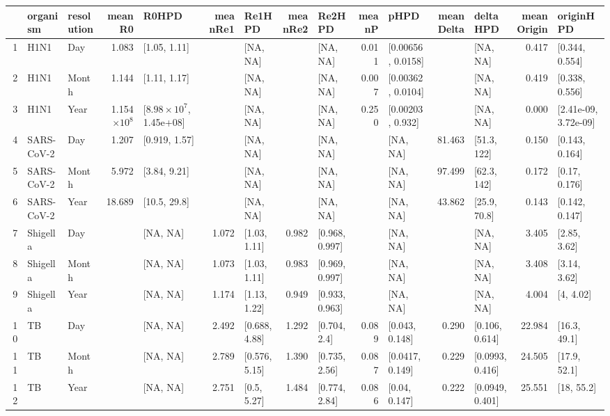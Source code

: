 \documentclass{article}
\begin{document}
\begin{spacing}{1.5}
\begin{table}[ht]
\centering
\begin{tabular}{rllrlrlrlrlrlrl}
  \hline
 & organism & resolution & meanR0 & R0HPD & meanRe1 & Re1HPD & meanRe2 & Re2HPD & meanP & pHPD & meanDelta & deltaHPD & meanOrigin & originHPD \\ 
  \hline
1 & H1N1 & Day & 1.083 & [1.05, 1.11] &  & [NA, NA] &  & [NA, NA] & 0.011 & [0.00656, 0.0158] &  & [NA, NA] & 0.417 & [0.344, 0.554] \\ 
  2 & H1N1 & Month & 1.144 & [1.11, 1.17] &  & [NA, NA] &  & [NA, NA] & 0.007 & [0.00362, 0.0104] &  & [NA, NA] & 0.419 & [0.338, 0.556] \\ 
  3 & H1N1 & Year & 1.154$\times 10^8$ & [$8.98\times10^7$, 1.45e+08] &  & [NA, NA] &  & [NA, NA] & 0.250 & [0.00203, 0.932] &  & [NA, NA] & 0.000 & [2.41e-09, 3.72e-09] \\ 
  4 & SARS-CoV-2 & Day & 1.207 & [0.919, 1.57] &  & [NA, NA] &  & [NA, NA] &  & [NA, NA] & 81.463 & [51.3, 122] & 0.150 & [0.143, 0.164] \\ 
  5 & SARS-CoV-2 & Month & 5.972 & [3.84, 9.21] &  & [NA, NA] &  & [NA, NA] &  & [NA, NA] & 97.499 & [62.3, 142] & 0.172 & [0.17, 0.176] \\ 
  6 & SARS-CoV-2 & Year & 18.689 & [10.5, 29.8] &  & [NA, NA] &  & [NA, NA] &  & [NA, NA] & 43.862 & [25.9, 70.8] & 0.143 & [0.142, 0.147] \\ 
  7 & Shigella & Day &  & [NA, NA] & 1.072 & [1.03, 1.11] & 0.982 & [0.968, 0.997] &  & [NA, NA] &  & [NA, NA] & 3.405 & [2.85, 3.62] \\ 
  8 & Shigella & Month &  & [NA, NA] & 1.073 & [1.03, 1.11] & 0.983 & [0.969, 0.997] &  & [NA, NA] &  & [NA, NA] & 3.408 & [3.14, 3.62] \\ 
  9 & Shigella & Year &  & [NA, NA] & 1.174 & [1.13, 1.22] & 0.949 & [0.933, 0.963] &  & [NA, NA] &  & [NA, NA] & 4.004 & [4, 4.02] \\ 
  10 & TB & Day &  & [NA, NA] & 2.492 & [0.688, 4.88] & 1.292 & [0.704, 2.4] & 0.089 & [0.043, 0.148] & 0.290 & [0.106, 0.614] & 22.984 & [16.3, 49.1] \\ 
  11 & TB & Month &  & [NA, NA] & 2.789 & [0.576, 5.15] & 1.390 & [0.735, 2.56] & 0.087 & [0.0417, 0.149] & 0.229 & [0.0993, 0.416] & 24.505 & [17.9, 52.1] \\ 
  12 & TB & Year &  & [NA, NA] & 2.751 & [0.5, 5.27] & 1.484 & [0.774, 2.84] & 0.086 & [0.04, 0.147] & 0.222 & [0.0949, 0.401] & 25.551 & [18, 55.2] \\ 
   \hline
\end{tabular}
\label{table:empData}
\end{table}


\end{spacing}
\end{document}
